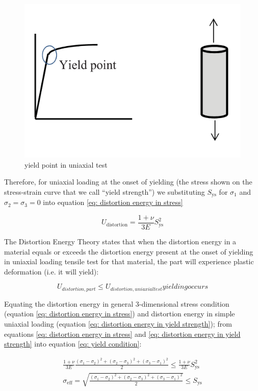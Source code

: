 \begin{figure}[h!]
\centering
\includegraphics[width=0.5\linewidth]{figures/uniaxial_test_yield}
\caption{yield point in uniaxial test}
\label{fig:uniaxialtestyield}
\end{figure}

Therefore, for uniaxial loading at the onset of yielding (the stress shown on the stress-strain curve that we call “yield strength”) we substituting $ S_\mathrm{ys} $ for $ \sigma_1 $ and $ \sigma_2 = \sigma_3 = 0 $ into equation \ref{eq: distortion energy in stress}

\begin{equation}\label{eq: distortion energy in yield strength}
U_\mathrm{distortion} = \frac{1+\nu}{3E} S_\mathrm{ys}^2
\end{equation}

The Distortion Energy Theory states that when the distortion energy in a material equals or exceeds the distortion energy present at the onset of yielding in uniaxial loading tensile test for that material, the part will experience plastic deformation (i.e. it will yield):

\begin{equation}\label{eq: yield condition}
U_{distortion, part} \leq U_{distortion, uniaxial test} yielding occurs
\end{equation}

Equating the distortion energy in general 3-dimensional stress condition (equation \ref{eq: distortion energy in stress}) and distortion energy in simple uniaxial loading (equation \ref{eq: distortion energy in yield strength}); from equations \ref{eq: distortion energy in stress} and \ref{eq: distortion energy in yield strength} into equation \ref{eq: yield condition}:

\begin{equation}\label{key}
\begin{split}
\frac{1+\nu}{3E}\frac{(\sigma_1-\sigma_2)^2+(\sigma_2-\sigma_3)^2+(\sigma_3-\sigma_1)^2}{2} \leq \frac{1+\nu}{3E} S_\mathrm{ys}^2 \\
\sigma_\mathrm{eff} = \sqrt{\frac{(\sigma_1-\sigma_2)^2+(\sigma_2-\sigma_3)^2+(\sigma_3-\sigma_1)^2}{2}} \leq S_\mathrm{ys}
\end{split}
\end{equation}